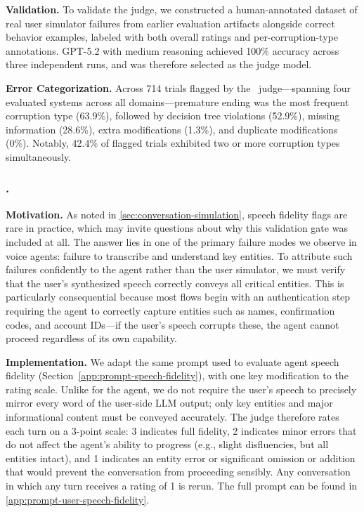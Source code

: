 \textbf{Validation.}
To validate the judge, we constructed a human-annotated dataset of real user simulator failures from earlier evaluation artifacts alongside correct behavior examples, labeled with both overall ratings and per-corruption-type annotations. GPT-5.2 with medium reasoning achieved 100\% accuracy across three independent runs, and was therefore selected as the judge model.

\textbf{Error Categorization.}
Across 714 trials flagged by the \metricbehavior~judge—spanning four evaluated systems across all domains—premature ending was the most frequent corruption type (63.9\%), followed by decision tree violations (52.9\%), missing information (28.6\%), extra modifications (1.3\%), and duplicate modifications (0\%). Notably, 42.4\% of flagged trials exhibited two or more corruption types simultaneously.

\subsubsection{\metricuserspeechfidelity.}

\textbf{Motivation.}
As noted in \autoref{sec:conversation-simulation}, speech fidelity flags are rare in practice, which may invite questions about why this validation gate was included at all. The answer lies in one of the primary failure modes we observe in voice agents: failure to transcribe and understand key entities. To attribute such failures confidently to the agent rather than the user simulator, we must verify that the user's synthesized speech correctly conveys all critical entities. This is particularly consequential because most flows begin with an authentication step requiring the agent to correctly capture entities such as names, confirmation codes, and account IDs—if the user's speech corrupts these, the agent cannot proceed regardless of its own capability.

\textbf{Implementation.}
We adapt the same prompt used to evaluate agent speech fidelity (Section~\ref{app:prompt-speech-fidelity}), with one key modification to the rating scale. Unlike for the agent, we do not require the user's speech to precisely mirror every word of the user-side LLM output; only key entities and major informational content must be conveyed accurately. The judge therefore rates each turn on a 3-point scale: 3 indicates full fidelity, 2 indicates minor errors that do not affect the agent's ability to progress (e.g., slight disfluencies, but all entities intact), and 1 indicates an entity error or significant omission or addition that would prevent the conversation from proceeding sensibly. Any conversation in which any turn receives a rating of 1 is rerun. The full prompt can be found in \autoref{app:prompt-user-speech-fidelity}.


